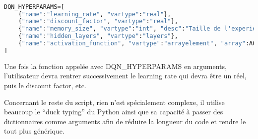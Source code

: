 \begin{lstlisting}[language=Python,breaklines=true, caption=Dictionnaire d'entrée de données]

DQN_HYPERPARAMS=[
    {"name":"learning_rate", "vartype":"real"}, 
    {"name":"discount_factor", "vartype":"real"},
    {"name":"memory_size", "vartype":"int", "desc":"Taille de l'experience replay"},
    {"name":"hidden_layers", "vartype":"layers"},
    {"name":"activation_function", "vartype":"arrayelement", "array":ACTIVATION_FUNCTIONS, "desc":"Fonction d'activation commune à tous les layers"}
]
\end{lstlisting}

Une fois la fonction appelée avec DQN\_HYPERPARAMS en arguments, l'utilisateur devra rentrer successivement le learning rate qui devra être un réel, puis le discount factor, etc.
\par
Concernant le reste du script, rien n'est spécialement complexe, il utilise beaucoup le ``duck typing'' du Python ainsi que sa capacité à passer des dictionnaires comme arguments afin de réduire la longueur du code et rendre le tout plus générique.

